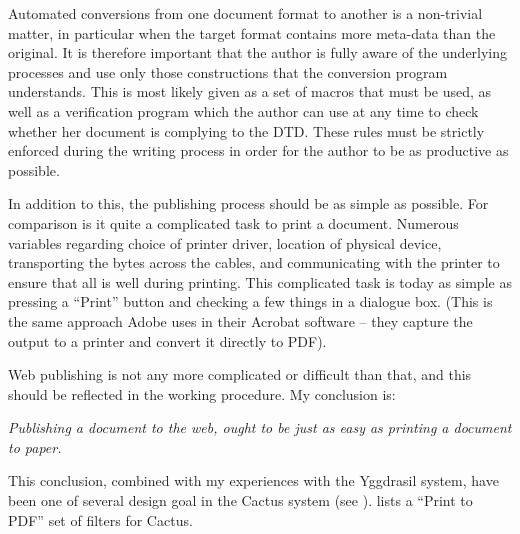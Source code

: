 Automated conversions from one document format to another is a
non-trivial matter, in particular when the target format contains more
meta-data than the original.  It is therefore important that the
author is fully aware of the underlying processes and use only those
constructions that the conversion program understands.  This is most
likely given as a set of macros that must be used, as well as a
verification program which the author can use at any time to check
whether her document is complying to the DTD.  These rules must be
strictly enforced during the writing process in order for the author
to be as productive as possible.

In addition to this, the publishing process should be as simple as
possible.  For comparison is it quite a complicated task to print a
document.  Numerous variables regarding choice of printer driver,
location of physical device, transporting the bytes across the cables,
and communicating with the printer to ensure that all is well during
printing.  This complicated task is today as simple as pressing a
``Print'' button and checking a few things in a dialogue box. (This is
the same approach Adobe uses in their Acrobat software -- they capture
the output to a printer and convert it directly to PDF).

Web publishing is not any more complicated or difficult than that, and
this should be reflected in the working procedure.  My conclusion is:

\begin{center}
  \textit{Publishing a document to the web, ought to be just
    as easy as printing a document to paper.}
\end{center}

This conclusion, combined with my experiences with the Yggdrasil
system, have been one of several design goal in the Cactus system (see
).  
lists a ``Print to PDF'' set of filters for Cactus.










